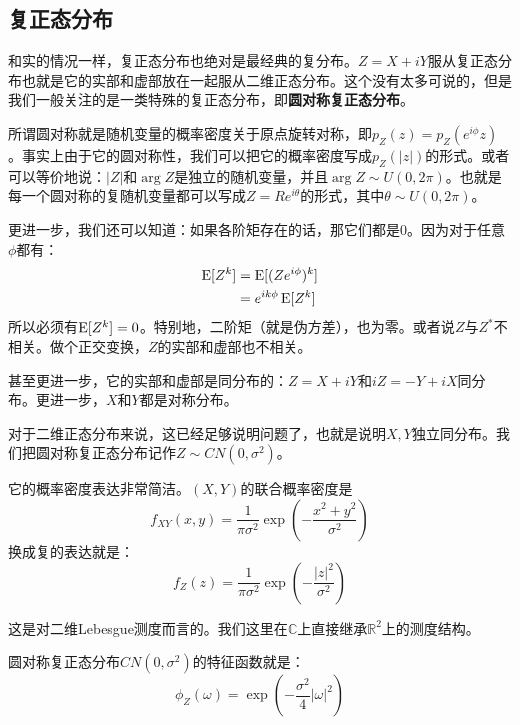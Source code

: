 \subsection{复正态分布}
和实的情况一样，复正态分布也绝对是最经典的复分布。\(Z=X+iY\)服从复正态分布也就是它的实部和虚部放在一起服从二维正态分布。这个没有太多可说的，但是我们一般关注的是一类特殊的复正态分布，即\textbf{圆对称复正态分布}。

所谓圆对称就是随机变量的概率密度关于原点旋转对称，即\(p_Z(z)=p_Z(e^{i\phi} z)\)。事实上由于它的圆对称性，我们可以把它的概率密度写成\(p_Z(|z|)\)的形式。或者可以等价地说：\(|Z|\)和\(\arg Z\)是独立的随机变量，并且\(\arg Z\sim U(0,2\pi)\)。也就是每一个圆对称的复随机变量都可以写成\(Z=Re^{i\theta}\)的形式，其中\(\theta \sim U(0,2\pi)\)。

更进一步，我们还可以知道：如果各阶矩存在的话，那它们都是\(0\)。因为对于任意\(\phi\)都有：
\begin{align*}
\operatorname{E}[Z^k] &= \operatorname{E}[(Ze^{i\phi})^k]\\
&= e^{ik\phi}\operatorname{E}[Z^k]
\end{align*}
所以必须有\(\operatorname{E}[Z^k]=0\)。特别地，二阶矩（就是伪方差），也为零。或者说\(Z\)与\(Z^*\)不相关。做个正交变换，\(Z\)的实部和虚部也不相关。

甚至更进一步，它的实部和虚部是同分布的：\(Z=X+iY\)和\(iZ=-Y+iX\)同分布。更进一步，\(X\)和\(Y\)都是对称分布。

对于二维正态分布来说，这已经足够说明问题了，也就是说明\(X,Y\)独立同分布。我们把圆对称复正态分布记作\(Z\sim CN(0,\sigma^2)\)。

它的概率密度表达非常简洁。\((X,Y)\)的联合概率密度是
\[
f_{XY}(x,y) = \frac{1}{\pi\sigma^2} \exp\left(-\frac{x^2+y^2}{\sigma^2}\right)
\]
换成复的表达就是：
\[
f_Z(z) = \frac{1}{\pi\sigma^2} \exp\left(-\frac{|z|^2}{\sigma^2}\right)
\]
\begin{attention}
这是对二维Lebesgue测度而言的。我们这里在\(\mathbb{C}\)上直接继承\(\mathbb{R}^2\)上的测度结构。
\end{attention}

圆对称复正态分布\(CN(0,\sigma^2)\)的特征函数就是：
\[
\phi_Z(\omega) = \exp\left(-\frac{\sigma^2}{4}|\omega|^2 \right)
\]
